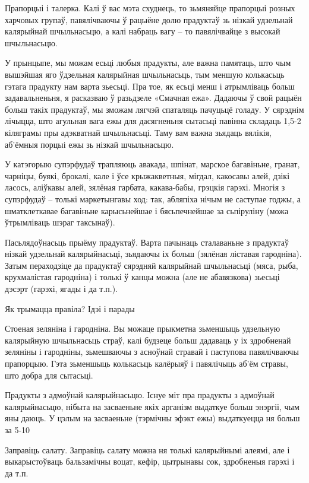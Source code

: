 Прапорцыі і талерка.
Калі ў вас мэта схуднець, то зьмяняйце прапорцыі розных харчовых групаў, павялічваючы ў рацыёне долю прадуктаў зь нізкай удзельнай калярыйнай шчыльнасьцю, а калі набраць вагу – то павялічвайце з высокай шчыльнасьцю.

У прынцыпе, мы можам есьці любыя прадукты, але важна памятаць, што чым вышэйшая яго ўдзельная калярыйная шчыльнасьць, тым меншую колькасьць гэтага прадукту нам варта зьесьці. Пра тое, як есьці менш і атрымліваць больш задавальненьня, я расказваю ў разьдзеле «Смачная ежа». Дадаючы ў свой рацыён больш такіх прадуктаў, мы зможам лягчэй спаталяць пачуцьцё голаду. У сярэднім лічыцца, што агульная вага ежы для дасягненьня сытасьці павінна складаць 1,5-2 кіляграмы пры адэкватнай шчыльнасьці. Таму вам важна зьядаць вялікія, аб'ёмныя порцыі ежы зь нізкай шчыльнасьцю.

У катэгорыю супэрфудаў трапляюць авакада, шпінат, марское багавіньне, гранат, чарніцы, буякі, брокалі, кале і ўсе крыжакветныя, мігдал, какосавы алей, дзікі ласось, аліўкавы алей, зялёная гарбата, какава-бабы, грэцкія гарэхі. Многія з супэрфудаў – толькі маркетынгавы ход: так, абляпіха нічым не саступае годжы, а шматклеткавае багавіньне карысьнейшае і бясьпечнейшае за сьпіруліну (можа ўтрымліваць шэраг таксынаў).

Пасьлядоўнасьць прыёму прадуктаў.
Варта пачынаць сталаваньне з прадуктаў нізкай удзельнай калярыйнасьці, зьядаючы іх больш (зялёная ліставая гародніна). Затым пераходзіце да прадуктаў сярэдняй калярыйнай шчыльнасьці (мяса, рыба, крухмалістая гародніна) і толькі ў канцы можна (але не абавязкова) зьесьці дэсэрт (гарэхі, ягады і да т.п.).

Як трымацца правіла? Ідэі і парады

Стоеная зеляніна і гародніна.
Вы можаце прыкметна зьменшыць удзельную калярыйную шчыльнасьць страў, калі будзеце больш дадаваць у іх здробненай зеляніны і гародніны, зьмешваючы з асноўнай стравай і паступова павялічваючы прапорцыю. Гэта зьменшыць колькасьць калёрыяў і павялічыць аб'ём стравы, што добра для сытасьці.

Прадукты з адмоўнай калярыйнасьцю.
Існуе міт пра прадукты з адмоўнай калярыйнасьцю, нібыта на засваеньне якіх арганізм выдаткуе больш энэргіі, чым яны даюць. У цэлым на засваеньне (тэрмічны эфэкт ежы) выдаткуецца ня больш за 5-10%

Заправіць салату.
Заправіць салату можна ня толькі калярыйнымі алеямі, але і выкарыстоўваць бальзамічны воцат, кефір, цытрынавы сок, здробненыя гарэхі і да т.п.

